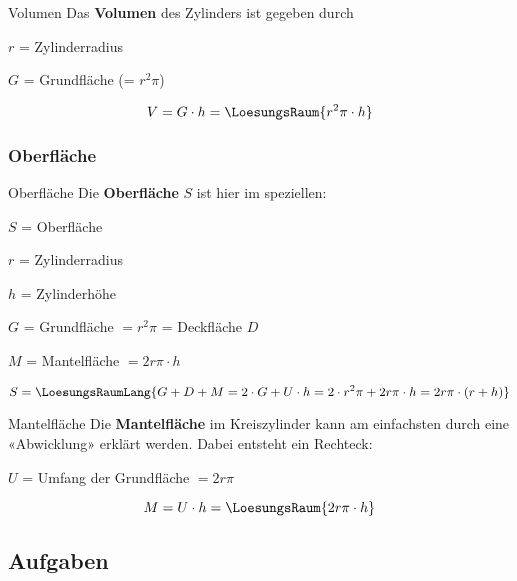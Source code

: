 \begin{gesetz}{Volumen}{}
  Das \textbf{Volumen} des Zylinders ist gegeben durch

  $r$ = Zylinderradius

  $G$ = Grundfläche (= $r^2\pi$)

  $$V = G\cdot{}h = \LoesungsRaum{r^2\pi\cdot{} h}$$
\end{gesetz}
\newpage

\subsubsection{Oberfläche}


\begin{gesetz}{Oberfläche}{}
  Die \textbf{Oberfläche} $S$ ist hier im speziellen:

  $S$ = Oberfläche

  $r$ = Zylinderradius

  $h$ = Zylinderhöhe

  $G$ = Grundfläche $=r^2\pi$ = Deckfläche $D$

  $M$ = Mantelfläche $=2r\pi\cdot{}h$
  
  $$S =\LoesungsRaumLang{G+D+M = 2\cdot{}G + U\cdot{}h = 2\cdot{}r^2\pi + 2r\pi\cdot{}h = 2r\pi\cdot{}(r + h)}$$
\end{gesetz}



\begin{bemerkung}{Mantelfläche}{}
  Die \textbf{Mantelfläche} im Kreiszylinder kann am einfachsten durch eine «Abwicklung» erklärt werden. Dabei entsteht ein Rechteck:

  $U$ = Umfang der Grundfläche $= 2r\pi$
  
  $$M = U\cdot{}h = \LoesungsRaum{2r\pi\cdot{}h}$$
\end{bemerkung}

\newpage

\subsection*{Aufgaben}

\newpage
